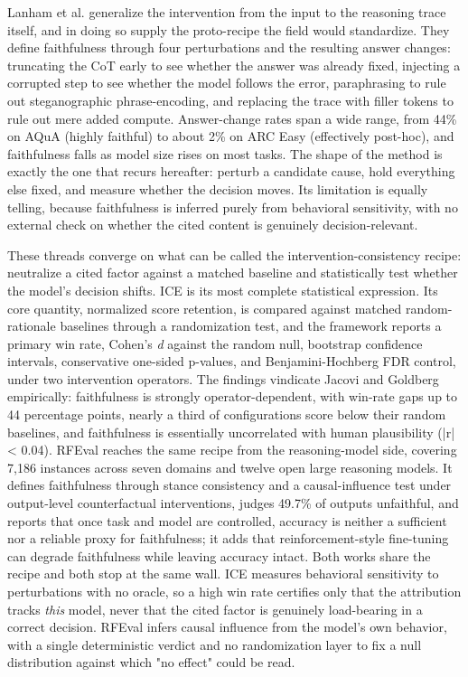 \documentclass[conference]{IEEEtran}
\begin{document}
Lanham et al. \cite{ref29} generalize the intervention from the input to the reasoning trace itself, and in doing so supply the proto-recipe the field would standardize. They define faithfulness through four perturbations and the resulting answer changes: truncating the CoT early to see whether the answer was already fixed, injecting a corrupted step to see whether the model follows the error, paraphrasing to rule out steganographic phrase-encoding, and replacing the trace with filler tokens to rule out mere added compute. Answer-change rates span a wide range, from 44\% on AQuA (highly faithful) to about 2\% on ARC Easy (effectively post-hoc), and faithfulness falls as model size rises on most tasks. The shape of the method is exactly the one that recurs hereafter: perturb a candidate cause, hold everything else fixed, and measure whether the decision moves. Its limitation is equally telling, because faithfulness is inferred purely from behavioral sensitivity, with no external check on whether the cited content is genuinely decision-relevant.

These threads converge on what can be called the intervention-consistency recipe: neutralize a cited factor against a matched baseline and statistically test whether the model's decision shifts. ICE \cite{ref17} is its most complete statistical expression. Its core quantity, normalized score retention, is compared against matched random-rationale baselines through a randomization test, and the framework reports a primary win rate, Cohen's \textit{d} against the random null, bootstrap confidence intervals, conservative one-sided p-values, and Benjamini-Hochberg FDR control, under two intervention operators. The findings vindicate Jacovi and Goldberg empirically: faithfulness is strongly operator-dependent, with win-rate gaps up to 44 percentage points, nearly a third of configurations score below their random baselines, and faithfulness is essentially uncorrelated with human plausibility (|r| < 0.04). RFEval \cite{ref16} reaches the same recipe from the reasoning-model side, covering 7,186 instances across seven domains and twelve open large reasoning models. It defines faithfulness through stance consistency and a causal-influence test under output-level counterfactual interventions, judges 49.7\% of outputs unfaithful, and reports that once task and model are controlled, accuracy is neither a sufficient nor a reliable proxy for faithfulness; it adds that reinforcement-style fine-tuning can degrade faithfulness while leaving accuracy intact. Both works share the recipe and both stop at the same wall. ICE measures behavioral sensitivity to perturbations with no oracle, so a high win rate certifies only that the attribution tracks \textit{this} model, never that the cited factor is genuinely load-bearing in a correct decision. RFEval infers causal influence from the model's own behavior, with a single deterministic verdict and no randomization layer to fix a null distribution against which "no effect" could be read.
\end{document}
